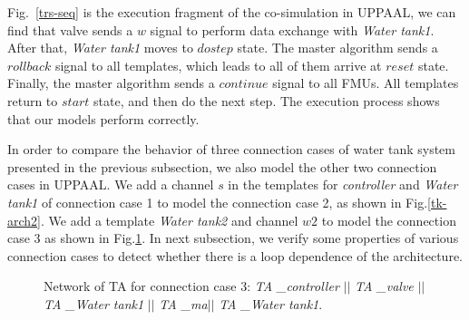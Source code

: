 Fig.~\ref{trs-seq} is the execution fragment of the co-simulation in UPPAAL, we can find that valve sends a $w$ signal to perform data exchange with \emph{Water tank1}. After that, \emph{Water tank1}  moves to $dostep$ state. The master algorithm sends a $rollback$ signal to all templates, which leads to all of them arrive at $reset$ state. Finally, the master algorithm sends a $continue$ signal to all FMUs. All templates return to $start$ state, and then do the next step. The execution process shows that our models perform correctly.

In order to compare the behavior of three connection cases of water tank system presented in the previous subsection, we also model the other two connection cases in UPPAAL. We add a channel $s$ in the templates for \emph{controller} and \emph{Water tank1} of connection case 1 to model the connection case 2, as shown in Fig.\ref{tk-arch2}. We add a template \emph{Water tank2} and channel $w2$ to model the connection case 3 as shown in Fig.\ref{arc3}. In next subsection, we verify some properties of various connection cases to detect whether there is a loop dependence of the architecture.
\begin{figure}[htbp]
\end{figure}
\begin{figure}[htbp]
	\caption{Network of TA for connection case 3: \emph{TA \_{controller}} $\vert\vert$ \emph{TA \_{valve}} $\vert\vert$ \emph{TA \_{Water tank1}} $\vert\vert$ \emph{TA \_{ma}}$\vert\vert$ \emph{TA \_{Water tank1}}.}\label{arc3}
\end{figure}

